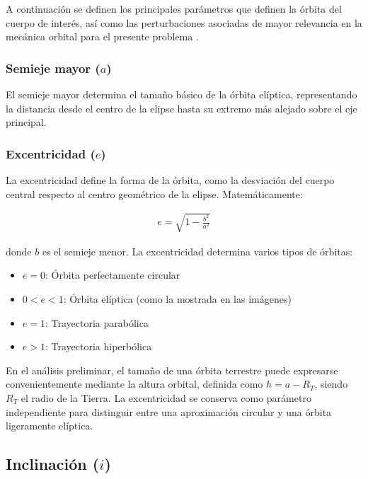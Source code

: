 A continuación se definen los principales parámetros que definen la órbita del cuerpo de interés, así como las perturbaciones asociadas de mayor relevancia en la mecánica orbital para el presente problema \cite{curtis2020orbital}.

\subsubsection*{Semieje mayor ($a$)}

El semieje mayor determina el tamaño básico de la órbita elíptica, representando la distancia desde el centro de la elipse hasta su extremo más alejado sobre el eje principal.

\subsubsection*{Excentricidad ($e$)}

La excentricidad define la forma de la órbita, como la desviación del cuerpo central respecto al centro geométrico de la elipse. Matemáticamente:

\begin{align}
e = \sqrt{1 - \frac{b^2}{a^2}}
\end{align}

donde \( b \) es el semieje menor. La excentricidad determina varios tipos de órbitas:

\begin{itemize}
    \item \( e = 0 \): Órbita perfectamente circular
    \item \( 0 < e < 1 \): Órbita elíptica (como la mostrada en las imágenes)
    \item \( e = 1 \): Trayectoria parabólica
    \item \( e > 1 \): Trayectoria hiperbólica
\end{itemize}

\noindent En el análisis preliminar, el tamaño de una órbita terrestre puede
expresarse convenientemente mediante la altura orbital, definida como
$h=a-R_T$, siendo $R_T$ el radio de la Tierra. La excentricidad se conserva
como parámetro independiente para distinguir entre una aproximación circular
y una órbita ligeramente elíptica.

\subsection{Inclinación \texorpdfstring{($i$)}{(i)}}

